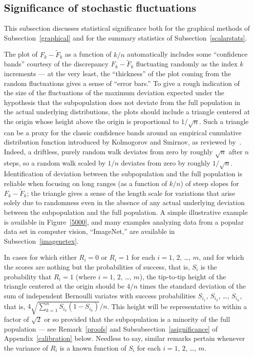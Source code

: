 \documentclass{article}
\begin{document}
\subsection{Significance of stochastic fluctuations}
\label{significance}

This subsection discusses statistical significance
both for the graphical methods of Subsection~\ref{graphical}
and for the summary statistics of Subsection~\ref{scalarstats}.

The plot of $F_k - \tilde{F}_k$ as a function of $k/n$ automatically
includes some ``confidence bands'' courtesy
of the discrepancy $F_k - \tilde{F}_k$ fluctuating randomly
as the index $k$ increments --- at the very least, the ``thickness''
of the plot coming from the random fluctuations gives a sense
of ``error bars.'' To give a rough indication of the size of the fluctuations
of the maximum deviation expected under the hypothesis that
the subpopulation does not deviate from the full population
in the actual underlying distributions, the plots should include
a triangle centered at the origin whose height above the origin
is proportional to $1/\sqrt{n}$.
Such a triangle can be a proxy for the classic confidence bands
around an empirical cumulative distribution function
introduced by Kolmogorov and Smirnov, as reviewed by~\cite{doksum}.
Indeed, a driftless, purely random walk deviates from zero
by roughly $\sqrt{n}$ after $n$ steps, so a random walk scaled by $1/n$
deviates from zero by roughly $1/\sqrt{n}$.
Identification of deviation between the subpopulation and the full population
is reliable when focusing on long ranges (as a function of $k/n$)
of steep slopes for $F_k - \tilde{F}_k$;
the triangle gives a sense of the length scale for variations
that arise solely due to randomness even in the absence
of any actual underlying deviation between the subpopulation
and the full population.
A simple illustrative example is available in Figure~\ref{5000},
and many examples analyzing data from a popular data set in computer vision,
``ImageNet,'' are available in Subsection~\ref{imagenetex}.

In cases for which either $R_i = 0$ or $R_i = 1$
for each $i = 1$, $2$, \dots, $m$,
and for which the scores are nothing but the probabilities of success,
that is, $S_i$ is the probability that $R_i = 1$
(where $i = 1$, $2$, \dots, $m$),
the tip-to-tip height of the triangle centered at the origin should be
$4/n$ times the standard deviation of the sum of independent Bernoulli variates
with success probabilities $S_{i_1}$, $S_{i_2}$, \dots, $S_{i_n}$, that is,
$4 \sqrt{\sum_{k=1}^n S_{i_k} (1-S_{i_k})} / n$.
This height will be representative to within a factor of $\sqrt{2}$ or so
provided that the subpopulation is a minority of the full population ---
see Remark~\ref{proofs} and Subsubsection~\ref{asignificance}
of Appendix~\ref{calibration} below.
Needless to say, similar remarks pertain whenever the variance of $R_i$
is a known function of $S_i$ for each $i = 1$, $2$, \dots, $m$.
\end{document}
